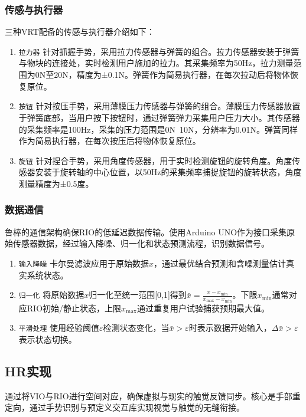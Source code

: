 \documentclass[runningheads]{llncs}
\begin{document}
\subsubsection{传感与执行器}
三种VRT配备的传感与执行器介绍如下：
\begin{enumerate}[label={\arabic*)}]
  \item \texttt{拉力器} 针对抓握手势，采用拉力传感器与弹簧的组合。拉力传感器安装于弹簧与物块的连接处，实时检测用户施加的拉力。其采集频率为50Hz，拉力测量范围为0N至20N，精度为±0.1N。弹簧作为简易执行器，在每次拉动后将物体恢复原位。
  \item \texttt{按钮} 针对按压手势，采用薄膜压力传感器与弹簧的组合。薄膜压力传感器放置于弹簧底部，当用户按下按钮时，通过弹簧弹力采集用户压力大小。其传感器的采集频率是100Hz，采集的压力范围是0N~10N，分辨率为0.01N。弹簧同样作为简易执行器，在每次按压后将物体恢复原位。
  \item \texttt{旋钮} 针对捏合手势，采用角度传感器，用于实时检测旋钮的旋转角度。角度传感器安装于旋转轴的中心位置，以50Hz的采集频率捕捉旋钮的旋转状态，角度测量精度为±0.5度。
\end{enumerate}

\subsubsection{数据通信}
鲁棒的通信架构确保RIO的低延迟数据传输。使用Arduino UNO作为接口采集原始传感器数据，经过输入降噪、归一化和状态预测流程，识别数据信号。
\begin{enumerate}[label={\arabic*)}]
  \item \texttt{输入降噪} 卡尔曼滤波应用于原始数据$x$，通过最优结合预测和含噪测量估计真实系统状态。
  \item \texttt{归一化} 将原始数据$x$归一化至统一范围[0,1]得到$\bar{x}=\displaystyle\frac{x-x_{\min}}{x_{\max}-x_{\min}}$。下限$x_{\min}$通常对应RIO初始/静止状态，上限$x_{\max}$通过重复用户试验捕获预期最大值。
  \item \texttt{平滑处理} 使用经验阈值$\varepsilon$检测状态变化，当$\bar{x}>\varepsilon$时表示数据开始输入，$\Delta\bar{x}>\varepsilon$表示状态切换。
\end{enumerate}

\subsection{HR实现}
通过将VIO与RIO进行空间对应，确保虚拟与现实的触觉反馈同步。核心是手部重定向，通过手势识别与预定义交互库实现视觉与触觉的无缝衔接。
\end{document}
